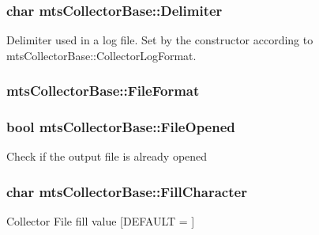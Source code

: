 \subsubsection[{Delimiter}]{\setlength{\rightskip}{0pt plus 5cm}char mts\+Collector\+Base\+::\+Delimiter\hspace{0.3cm}{\ttfamily [protected]}}\label{classmts_collector_base_a7d711ebe23e8573509789daa9e7392e6}
Delimiter used in a log file. Set by the constructor according to mts\+Collector\+Base\+::\+Collector\+Log\+Format. \hypertarget{classmts_collector_base_a5afbc705a454a6e1394ff4bfd1c17774}{}
\subsubsection[{File\+Format}]{ mts\+Collector\+Base\+::\+File\+Format\hspace{0.3cm}{\ttfamily [protected]}}\label{classmts_collector_base_a5afbc705a454a6e1394ff4bfd1c17774}
\hypertarget{classmts_collector_base_a051e5495fad8d0ade499d031e8d9ffbc}{}
\subsubsection[{File\+Opened}]{\setlength{\rightskip}{0pt plus 5cm}bool mts\+Collector\+Base\+::\+File\+Opened\hspace{0.3cm}{\ttfamily [protected]}}\label{classmts_collector_base_a051e5495fad8d0ade499d031e8d9ffbc}
Check if the output file is already opened \hypertarget{classmts_collector_base_a7d28e7a5dc2c367f963a53f9b786776d}{}
\subsubsection[{Fill\+Character}]{\setlength{\rightskip}{0pt plus 5cm}char mts\+Collector\+Base\+::\+Fill\+Character\hspace{0.3cm}{\ttfamily [protected]}}\label{classmts_collector_base_a7d28e7a5dc2c367f963a53f9b786776d}
Collector File fill value \mbox{[}D\+E\+F\+A\+U\+L\+T = \textquotesingle{} \textquotesingle{}\mbox{]} \hypertarget{classmts_collector_base_abed8163d5f91e30ac10344e82c405cd7}{}
